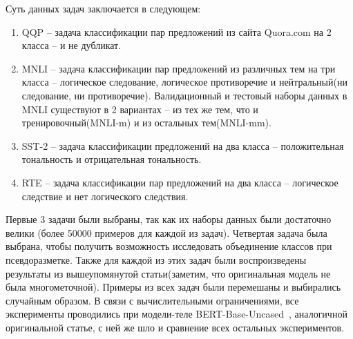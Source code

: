 Суть данных задач заключается в следующем:
\begin{enumerate}
    \item QQP -- задача классификации пар предложений из сайта Quora.com на 2 класса -- и не дубликат.
    \item MNLI -- задача классификации пар предложений из различных тем на три класса -- логическое следование, логическое противоречие и нейтральный(ни следование, ни противоречие). Валидационный и тестовый наборы данных в MNLI существуют в 2 вариантах -- из тех же тем, что и тренировочный(MNLI-m) и из остальных тем(MNLI-mm).
    \item SST-2 -- задача классификации предложений на два класса -- положительная тональность и отрицательная тональность.
    \item RTE --  задача классификации пар предложений на два класса -- логическое следствие и нет логического следствия.
\end{enumerate}

Первые 3 задачи были выбраны, так как их наборы данных были достаточно велики (более 50000 примеров для каждой из задач). Четвертая задача была выбрана, чтобы получить возможность исследовать объединение классов при псевдоразметке. Также для каждой из этих задач были воспроизведены результаты из вышеупомянутой статьи(заметим, что оригинальная модель не была многометочной). Примеры из всех задач были перемешаны и выбирались случайным образом. В связи с вычислительными ограничениями, все эксперименты проводились при модели-теле BERT-Base-Uncased~\cite{devlin_2018}, аналогичной оригинальной статье, с ней же шло и сравнение всех остальных экспериментов.

